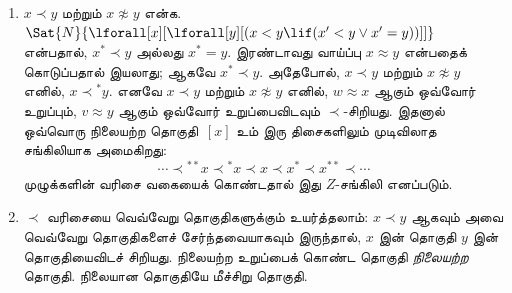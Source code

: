 \documentclass[11pt,a4paper,openany]{memoir}
\begin{document}
\begin{enumerate}
\item $x \prec y$ மற்றும் $x \not\approx y$
  என்க. $\Sat{N}{\lforall[x][\lforall[y][(x < y \lif (x' < y \lor x' =
      y))]]}$ என்பதால், $x^* \prec y$ அல்லது
  $x^* = y$. இரண்டாவது வாய்ப்பு
  $x \approx y$ என்பதைக் கொடுப்பதால் இயலாது;
  ஆகவே $x^* \prec y$. அதேபோல்,
  $x \prec y$ மற்றும் $x \not\approx y$
  எனில், $x \prec {^*y}$. எனவே
  $x \prec y$ மற்றும் $x \not\approx y$
  எனில், $w \approx x$ ஆகும் ஒவ்வோர்
  உறுப்பும், $v \approx y$ ஆகும் ஒவ்வோர்
  உறுப்பைவிடவும் $\prec$-சிறியது.
  இதனால் ஒவ்வொரு நிலையற்ற தொகுதி~$[x]$ உம்
  இரு திசைகளிலும் முடிவிலாத சங்கிலியாக அமைகிறது:
  \[
  \cdots \prec  {^{**}x} \prec {^*}x \prec x \prec x^* \prec x^{**}
  \prec \cdots
  \]
  முழுக்களின் வரிசை வகையைக் கொண்டதால் இது
  $Z$-சங்கிலி எனப்படும்.

\item $\prec$ வரிசையை வெவ்வேறு தொகுதிகளுக்கும்
  உயர்த்தலாம்: $x \prec y$ ஆகவும் அவை
  வெவ்வேறு தொகுதிகளைச் சேர்ந்தவையாகவும் இருந்தால்,
  $x$ இன் தொகுதி $y$ இன் தொகுதியைவிடச் சிறியது.
  நிலையற்ற உறுப்பைக் கொண்ட தொகுதி
  \emph{நிலையற்ற} தொகுதி. நிலையான தொகுதியே
  மீச்சிறு தொகுதி.


\end{enumerate}
\end{document}
